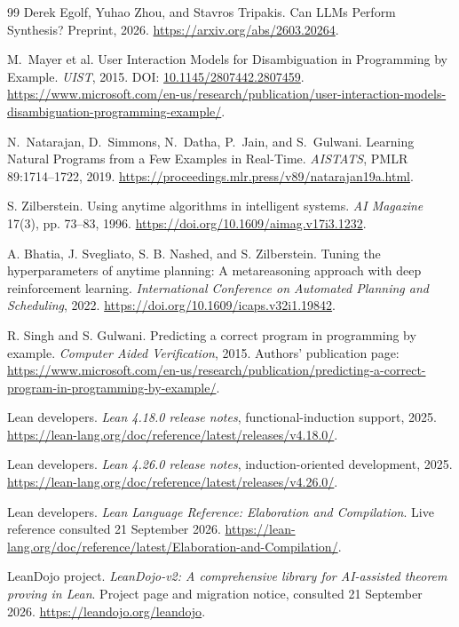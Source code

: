 \begin{thebibliography}{99}
 Derek Egolf, Yuhao Zhou, and Stavros Tripakis.
Can LLMs Perform Synthesis? Preprint, 2026.
\url{https://arxiv.org/abs/2603.20264}.

 M.~Mayer et al. User Interaction Models for Disambiguation in Programming
by Example. \emph{UIST}, 2015.
DOI: \href{https://doi.org/10.1145/2807442.2807459}{10.1145/2807442.2807459}.
\url{https://www.microsoft.com/en-us/research/publication/user-interaction-models-disambiguation-programming-example/}.

 N.~Natarajan, D.~Simmons, N.~Datha, P.~Jain, and S.~Gulwani.
Learning Natural Programs from a Few Examples in Real-Time.
\emph{AISTATS}, PMLR 89:1714--1722, 2019.
\url{https://proceedings.mlr.press/v89/natarajan19a.html}.

 S. Zilberstein.
Using anytime algorithms in intelligent systems.
\emph{AI Magazine} 17(3), pp. 73--83, 1996.
\url{https://doi.org/10.1609/aimag.v17i3.1232}.

 A. Bhatia, J. Svegliato, S. B. Nashed, and S. Zilberstein.
Tuning the hyperparameters of anytime planning: A metareasoning approach with deep reinforcement learning.
\emph{International Conference on Automated Planning and Scheduling}, 2022.
\url{https://doi.org/10.1609/icaps.v32i1.19842}.

 R. Singh and S. Gulwani.
Predicting a correct program in programming by example.
\emph{Computer Aided Verification}, 2015. Authors' publication page:
\url{https://www.microsoft.com/en-us/research/publication/predicting-a-correct-program-in-programming-by-example/}.

 Lean developers.
\emph{Lean 4.18.0 release notes}, functional-induction support, 2025.
\url{https://lean-lang.org/doc/reference/latest/releases/v4.18.0/}.

 Lean developers.
\emph{Lean 4.26.0 release notes}, induction-oriented  development, 2025.
\url{https://lean-lang.org/doc/reference/latest/releases/v4.26.0/}.

 Lean developers.
\emph{Lean Language Reference: Elaboration and Compilation}. Live reference consulted 21 September 2026.
\url{https://lean-lang.org/doc/reference/latest/Elaboration-and-Compilation/}.

 LeanDojo project.
\emph{LeanDojo-v2: A comprehensive library for AI-assisted theorem proving in Lean}. Project page and migration notice, consulted 21 September 2026.
\url{https://leandojo.org/leandojo}.


\end{thebibliography}
